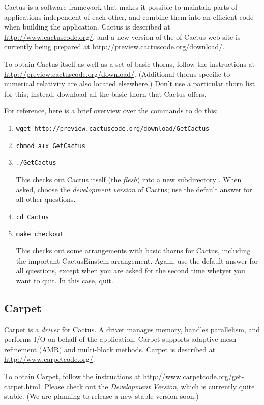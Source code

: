 Cactus \cite{Goodale02a, ES-cactusweb} is a software framework that
makes it possible to maintain parts of applications independent of
each other, and combine them into an efficient code when building the
application.  Cactus is described at \url{http://www.cactuscode.org/},
and a new version of the of Cactus web site is currently being
prepared at \url{http://preview.cactuscode.org/download/}.

To obtain Cactus itself as well as a set of basic thorns, follow the
instructions at \url{http://preview.cactuscode.org/download/}.
(Additional thorns specific to numerical relativity are also located
elsewhere.)  Don't use a particular thorn list for this; instead,
download all the basic thorn that Cactus offers.

For reference, here is a brief overview over the commands to do this:
\begin{enumerate}
\item\verb+wget http://preview.cactuscode.org/download/GetCactus+
\item\verb-chmod a+x GetCactus-
\item\verb+./GetCactus+
  
  This checks out Cactus itself (the \emph{flesh}) into a new
  subdirectory .  When asked, choose the
  \emph{development version} of Cactus; use the default answer for all
  other questions.
\item\verb+cd Cactus+
\item\verb+make checkout+
  
  This checks out some arrangements with basic thorns for Cactus,
  including the important CactusEinstein arrangement.  Again, use the
  default answer for all questions, except when you are asked for the
  second time whetyer you want to quit.  In this case, quit.
\end{enumerate}

\subsection{Carpet}

Carpet \cite{ES-Schnetter2003b, ES-Schnetter2006a, ES-carpetweb} is a
\emph{driver} for Cactus.  A driver manages memory, handles
parallelism, and performs I/O on behalf of the application.  Carpet
supports adaptive mesh refinement (AMR) and multi-block methods.
Carpet is described at \url{http://www.carpetcode.org/}.

To obtain Carpet, follow the instructions at
\url{http://www.carpetcode.org/get-carpet.html}.  Please check out the
\emph{Development Version}, which is currently quite stable.  (We are
planning to release a new stable version soon.)

